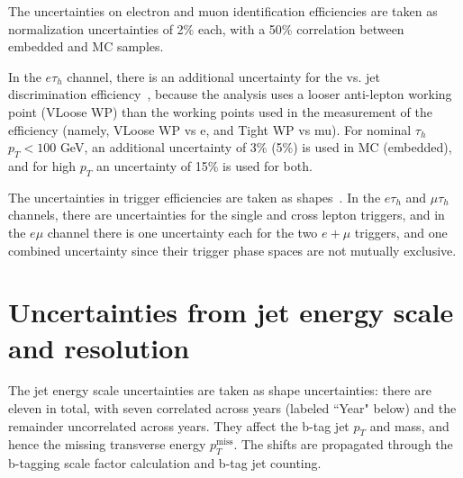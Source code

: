 The uncertainties on electron and muon identification efficiencies are taken as normalization uncertainties of 2\% each, with a 50\% correlation between embedded and MC samples.

In the $e\tau_{h}$ channel, there is an additional uncertainty for the vs. jet discrimination efficiency~\cite{twiki_TAU_POG_tauidrecommendationforrun2}, because the analysis uses a looser anti-lepton working point (VLoose WP) than the working points used in the measurement of the efficiency (namely, VLoose WP vs e, and Tight WP vs mu). For nominal $\tau_{h}$ $p_{T} < 100$ GeV, an additional uncertainty of 3\% (5\%) is used in MC (embedded), and for high $p_{T}$ an uncertainty of 15\% is used for both.

The uncertainties in trigger efficiencies are taken as shapes~\cite{twiki_TAU_POG_tauidrecommendationforrun2}. In the $e\tau_{h}$ and $\mu\tau_{h}$ channels, there are uncertainties for the single and cross lepton triggers, and in the $e\mu$ channel there is one uncertainty each for the two $e+\mu$ triggers, and one combined uncertainty since their trigger phase spaces are not mutually exclusive.

\section{Uncertainties from jet energy scale and resolution}
\label{section:JEC_sys}
The jet energy scale uncertainties are taken as shape uncertainties: there are eleven in total, with seven correlated across years (labeled ``Year" below) and the remainder uncorrelated across years. They affect the b-tag jet $p_{T}$ and mass, and hence the missing transverse energy $p_{T}^{\text{miss}}$. The shifts are propagated through the b-tagging scale factor calculation and b-tag jet counting. 

